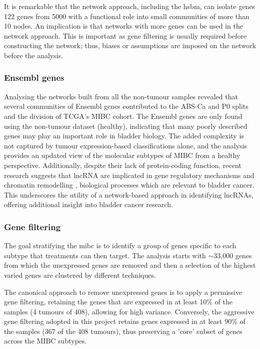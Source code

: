 It is remarkable that the network approach, including the \acrshort{hsbm}, can isolate genes 122 genes from 5000 with a functional role into small communities of more than 10 nodes. An implication is that networks with more genes can be used in the network approach. This is important as gene filtering is usually required before constructing the network; thus, biases or assumptions are imposed on the network before the analysis.

\subsubsection*{Ensembl genes}

Analysing the networks built from all the non-tumour samples revealed that several communities of Ensembl genes contributed to the ABS-Ca and P0 splits and the division of TCGA's MIBC cohort. The Ensembl genes are only found using the non-tumour dataset (healthy), indicating that many poorly described genes may play an important role in bladder biology. The added complexity is not captured by tumour expression-based classifications alone, and the analysis provides an updated view of the molecular subtypes of MIBC from a healthy perspective. Additionally, despite their lack of protein-coding function, recent research suggests that \acrlong{lncRNA} are implicated in gene regulatory mechanisms and chromatin remodelling \citep{Statello2021-md}, biological processes which are relevant to bladder cancer. This underscores the utility of a network-based approach in identifying lncRNAs, offering additional insight into bladder cancer research.


\subsubsection*{Gene filtering} \label{s:discussion:gene_filt}

The goal stratifying the \acrshort{mibc} is to identify a group of genes specific to each subtype that treatments can then target. The analysis starts with $\sim$33,000 genes from which the unexpressed genes are removed and then a selection of the highest varied genes are clustered by different techniques.

The canonical approach to remove unexpressed genes is to apply a permissive gene filtering, retaining the genes that are expressed in at least 10\% of the samples (4 tumours of 408), allowing for high variance. Conversely, the aggressive gene filtering adopted in this project retains genes expressed in at least 90\% of the samples (367 of the 408 tumours), thus preserving a 'core' subset of genes across the \gls{MIBC} subtypes.

